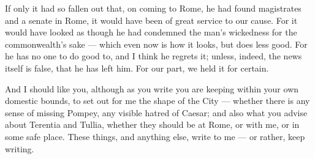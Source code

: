  If only it had so fallen out that, on coming to Rome, he had found magistrates and a senate in Rome, it would have been of great service to our cause. For it would have looked as though he had condemned the man's wickedness for the commonwealth's sake --- which even now is how it looks, but does less good. For he has no one to do good to, and I think he regrets it; unless, indeed, the news itself is false, that he has left him. For our part, we held it for certain.

 And I should like you, although as you write you are keeping within your own domestic bounds, to set out for me the shape of the City --- whether there is any sense of missing Pompey, any visible hatred of Caesar; and also what you advise about Terentia and Tullia, whether they should be at Rome, or with me, or in some safe place. These things, and anything else, write to me --- or rather, keep writing.

